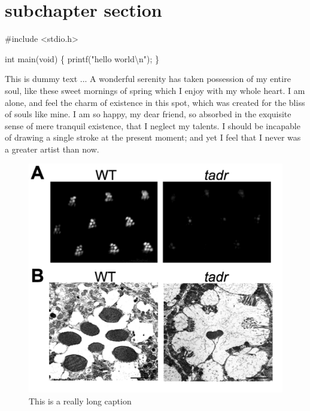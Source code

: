 \documentclass[letterpaper,oneside,11pt]{book}
\newenvironment{Shaded}{}{}
\newcommand{\DataTypeTok}[1]{\textcolor[rgb]{0.56,0.13,0.00}{{#1}}}
\newcommand{\SpecialCharTok}[1]{\textcolor[rgb]{0.25,0.44,0.63}{{#1}}}
\newcommand{\StringTok}[1]{\textcolor[rgb]{0.25,0.44,0.63}{{#1}}}
\newcommand{\ImportTok}[1]{{#1}}
\newcommand{\PreprocessorTok}[1]{\textcolor[rgb]{0.74,0.48,0.00}{{#1}}}
\newcommand{\NormalTok}[1]{{#1}}
\begin{document}
\section{subchapter section}\label{subchapter-section-2}

\begin{Shaded}
\begin{Highlighting}[]

\PreprocessorTok{#include }\ImportTok{<stdio.h>}

\DataTypeTok{int}\NormalTok{ main(}\DataTypeTok{void}\NormalTok{)}
\NormalTok{\{}
\NormalTok{    printf(}\StringTok{"hello world}\SpecialCharTok{\textbackslash{}n}\StringTok{"}\NormalTok{);}
\NormalTok{\}}
\end{Highlighting}
\end{Shaded}




This is dummy text ... A wonderful serenity has taken possession of my entire soul, like these sweet mornings of spring which I enjoy with my whole heart. I am alone, and feel the charm of existence in this spot, which was created for the bliss of souls like mine. I am so happy, my dear friend, so absorbed in the exquisite sense of mere tranquil existence, that I neglect my talents. I should be incapable of drawing a single stroke at the present moment; and yet I feel that I never was a greater artist than now.


\begin{figure}[p]
\centering
\label{fig:two}
\includegraphics[width=\textwidth, height=\textheight, keepaspectratio]{figs/fig2.jpg}
\caption[this is a short caption
]{This is a really long caption}
\end{figure}
\end{document}
